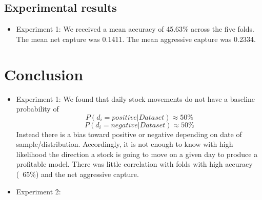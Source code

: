 \documentclass[11pt,letterpaper]{article}
\newcommand{\blue}[1]{\textcolor{RoyalBlue}{#1}}
\newcommand{\instructions}[1]{\blue{\textit{#1}}}
\begin{document}
\subsection{Experimental results}
\label{sec:experimental-results}
\begin{itemize}
\item Experiment 1: We received a mean accuracy of 45.63\% across the five folds.
  The mean net capture was 0.1411. The mean aggressive capture was 0.2334.
\end{itemize}

\section{Conclusion}
\begin{itemize}
\item Experiment 1: We found that daily stock movements do not have a
  baseline probability of
\[
  	P(\text{\(d_i = positive\)} | \text{\(Dataset\)}) \approx 50\%
\]
\[
  	P(\text{\(d_i = negative\)} | \text{\(Dataset\)}) \approx 50\%
\]
  Instead there is a bias toward positive or negative depending on date of sample/distribution.
  Accordingly, it is not enough to know with high likelihood the direction a
  stock is going to move on a given day to produce a profitable model. There
  was little correlation with folds with high accuracy (~65\%) and the
  net aggressive capture.
\item Experiment 2:
\end{itemize}

\end{document}
